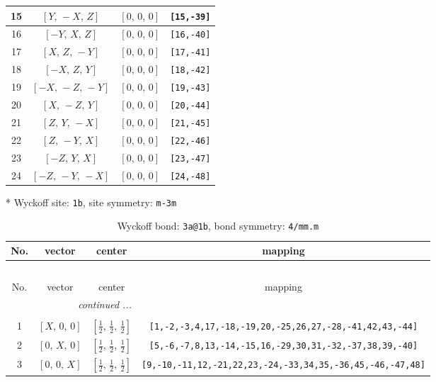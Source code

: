 \documentclass[fleqn,8pt]{jsarticle}
\begin{document}
\begin{longtable}{cccc}
15 & $\left[ Y,\, - X,\, Z \right]$ & $\left[ 0,\, 0,\, 0 \right]$ & {\tt [15,-39]} \\ \hline
16 & $\left[ - Y,\, X,\, Z \right]$ & $\left[ 0,\, 0,\, 0 \right]$ & {\tt [16,-40]} \\ \hline
17 & $\left[ X,\, Z,\, - Y \right]$ & $\left[ 0,\, 0,\, 0 \right]$ & {\tt [17,-41]} \\ \hline
18 & $\left[ - X,\, Z,\, Y \right]$ & $\left[ 0,\, 0,\, 0 \right]$ & {\tt [18,-42]} \\ \hline
19 & $\left[ - X,\, - Z,\, - Y \right]$ & $\left[ 0,\, 0,\, 0 \right]$ & {\tt [19,-43]} \\ \hline
20 & $\left[ X,\, - Z,\, Y \right]$ & $\left[ 0,\, 0,\, 0 \right]$ & {\tt [20,-44]} \\ \hline
21 & $\left[ Z,\, Y,\, - X \right]$ & $\left[ 0,\, 0,\, 0 \right]$ & {\tt [21,-45]} \\ \hline
22 & $\left[ Z,\, - Y,\, X \right]$ & $\left[ 0,\, 0,\, 0 \right]$ & {\tt [22,-46]} \\ \hline
23 & $\left[ - Z,\, Y,\, X \right]$ & $\left[ 0,\, 0,\, 0 \right]$ & {\tt [23,-47]} \\ \hline
24 & $\left[ - Z,\, - Y,\, - X \right]$ & $\left[ 0,\, 0,\, 0 \right]$ & {\tt [24,-48]} \\
\end{longtable}
* Wyckoff site: {\tt 1b}, site symmetry: {\tt m-3m}
\renewcommand{\arraystretch}{1.2}
\begin{longtable}{cccc}
\caption{Wyckoff bond: {\tt 3a@1b}, bond symmetry: {\tt 4/mm.m}}
 \\
 \hline \hline
No. & vector & center & mapping \\ \hline \endfirsthead

\multicolumn{3}{l}{\tablename\ \thetable{}} \\
 \hline \hline
No. & vector & center & mapping \\ \hline \endhead

 \hline \hline
\multicolumn{3}{r}{\footnotesize\it continued ...} \\ \endfoot

 \hline \hline
\multicolumn{3}{r}{} \\ \endlastfoot

1 & $\left[ X,\, 0,\, 0 \right]$ & $\left[ \frac{1}{2},\, \frac{1}{2},\, \frac{1}{2} \right]$ & {\tt [1,-2,-3,4,17,-18,-19,20,-25,26,27,-28,-41,42,43,-44]} \\ \hline
2 & $\left[ 0,\, X,\, 0 \right]$ & $\left[ \frac{1}{2},\, \frac{1}{2},\, \frac{1}{2} \right]$ & {\tt [5,-6,-7,8,13,-14,-15,16,-29,30,31,-32,-37,38,39,-40]} \\ \hline
3 & $\left[ 0,\, 0,\, X \right]$ & $\left[ \frac{1}{2},\, \frac{1}{2},\, \frac{1}{2} \right]$ & {\tt [9,-10,-11,12,-21,22,23,-24,-33,34,35,-36,45,-46,-47,48]} \\
\end{longtable}
\end{document}
